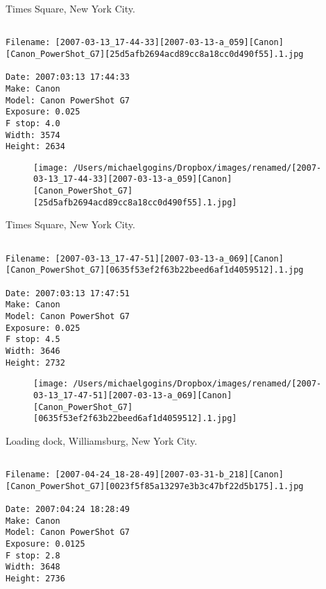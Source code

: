 \clearpage
\onecolumn
\noindent Times Square, New York City.
\noindent
\begin{lstlisting}

Filename: [2007-03-13_17-44-33][2007-03-13-a_059][Canon][Canon_PowerShot_G7][25d5afb2694acd89cc8a18cc0d490f55].1.jpg

Date: 2007:03:13 17:44:33
Make: Canon
Model: Canon PowerShot G7
Exposure: 0.025
F stop: 4.0
Width: 3574
Height: 2634
\end{lstlisting}
\clearpage

\begin{figure}
\texttt{[image: /Users/michaelgogins/Dropbox/images/renamed/[2007-03-13\_17-44-33][2007-03-13-a\_059][Canon][Canon\_PowerShot\_G7][25d5afb2694acd89cc8a18cc0d490f55].1.jpg]}
\end{figure}
    
\clearpage
\onecolumn
\noindent Times Square, New York City.
\noindent
\begin{lstlisting}

Filename: [2007-03-13_17-47-51][2007-03-13-a_069][Canon][Canon_PowerShot_G7][0635f53ef2f63b22beed6af1d4059512].1.jpg

Date: 2007:03:13 17:47:51
Make: Canon
Model: Canon PowerShot G7
Exposure: 0.025
F stop: 4.5
Width: 3646
Height: 2732
\end{lstlisting}
\clearpage

\begin{figure}
\texttt{[image: /Users/michaelgogins/Dropbox/images/renamed/[2007-03-13\_17-47-51][2007-03-13-a\_069][Canon][Canon\_PowerShot\_G7][0635f53ef2f63b22beed6af1d4059512].1.jpg]}
\end{figure}
    
\clearpage
\onecolumn
\noindent Loading dock, Williamsburg, New York City.
\noindent
\begin{lstlisting}

Filename: [2007-04-24_18-28-49][2007-03-31-b_218][Canon][Canon_PowerShot_G7][0023f5f85a13297e3b3c47bf22d5b175].1.jpg

Date: 2007:04:24 18:28:49
Make: Canon
Model: Canon PowerShot G7
Exposure: 0.0125
F stop: 2.8
Width: 3648
Height: 2736
\end{lstlisting}
\clearpage

